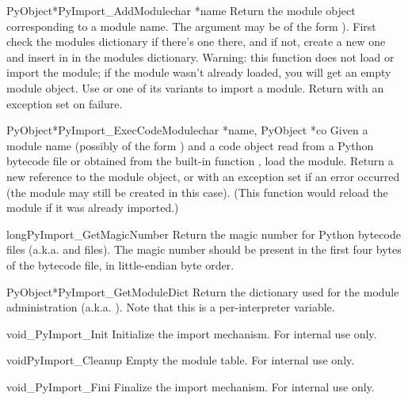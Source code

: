 \documentclass{manual}
\begin{document}
\begin{cfuncdesc}{PyObject*}{PyImport_AddModule}{char *name}
Return the module object corresponding to a module name.  The
 argument may be of the form ).  First
check the modules dictionary if there's one there, and if not, create
a new one and insert in in the modules dictionary.
Warning: this function does not load or import the module; if the
module wasn't already loaded, you will get an empty module object.
Use  or one of its variants to
import a module.
Return \NULL{} with an exception set on failure.
\end{cfuncdesc}

\begin{cfuncdesc}{PyObject*}{PyImport_ExecCodeModule}{char *name, PyObject *co}
Given a module name (possibly of the form ) and a
code object read from a Python bytecode file or obtained from the
built-in function , load the
module.  Return a new reference to the module object, or \NULL{} with
an exception set if an error occurred (the module may still be created
in this case).  (This function would reload the module if it was
already imported.)
\end{cfuncdesc}

\begin{cfuncdesc}{long}{PyImport_GetMagicNumber}{}
Return the magic number for Python bytecode files (a.k.a.
 and  files).  The magic number should be
present in the first four bytes of the bytecode file, in little-endian
byte order.
\end{cfuncdesc}

\begin{cfuncdesc}{PyObject*}{PyImport_GetModuleDict}{}
Return the dictionary used for the module administration
(a.k.a. ).  Note that this is a per-interpreter
variable.
\end{cfuncdesc}

\begin{cfuncdesc}{void}{_PyImport_Init}{}
Initialize the import mechanism.  For internal use only.
\end{cfuncdesc}

\begin{cfuncdesc}{void}{PyImport_Cleanup}{}
Empty the module table.  For internal use only.
\end{cfuncdesc}

\begin{cfuncdesc}{void}{_PyImport_Fini}{}
Finalize the import mechanism.  For internal use only.
\end{cfuncdesc}
\end{document}
